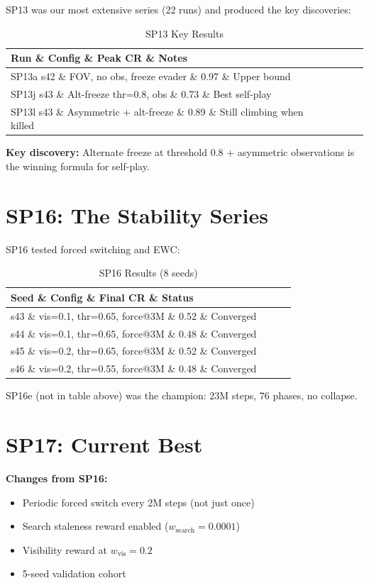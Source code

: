 \documentclass[11pt,a4paper]{report}
\begin{document}
SP13 was our most extensive series (22 runs) and produced the key discoveries:

\begin{table}[h]
\centering
\caption{SP13 Key Results}
\begin{tabular}{@{}llll@{}}
\toprule
\textbf{Run} \& \textbf{Config} \& \textbf{Peak CR} \& \textbf{Notes} \\
\midrule
SP13a s42 \& FOV, no obs, freeze evader \& 0.97 \& Upper bound \\
SP13j s43 \& Alt-freeze thr=0.8, obs \& 0.73 \& Best self-play \\
SP13l s43 \& Asymmetric + alt-freeze \& 0.89 \& Still climbing when killed \\
\bottomrule
\end{tabular}
\end{table}

\textbf{Key discovery:} Alternate freeze at threshold 0.8 + asymmetric observations is the winning formula for self-play.

\section{SP16: The Stability Series}

SP16 tested forced switching and EWC:

\begin{table}[h]
\centering
\caption{SP16 Results (8 seeds)}
\begin{tabular}{@{}llll@{}}
\toprule
\textbf{Seed} \& \textbf{Config} \& \textbf{Final CR} \& \textbf{Status} \\
\midrule
s43 \& vis=0.1, thr=0.65, force@3M \& 0.52 \& Converged \\
s44 \& vis=0.1, thr=0.65, force@3M \& 0.48 \& Converged \\
s45 \& vis=0.2, thr=0.65, force@3M \& 0.52 \& Converged \\
s46 \& vis=0.2, thr=0.55, force@3M \& 0.48 \& Converged \\
\bottomrule
\end{tabular}
\end{table}

SP16e (not in table above) was the champion: 23M steps, 76 phases, no collapse.

\section{SP17: Current Best}

\textbf{Changes from SP16:}
\begin{itemize}
    \item Periodic forced switch every 2M steps (not just once)
    \item Search staleness reward enabled ($w_{\text{search}} = 0.0001$)
    \item Visibility reward at $w_{\text{vis}} = 0.2$
    \item 5-seed validation cohort
\end{itemize}
\end{document}
